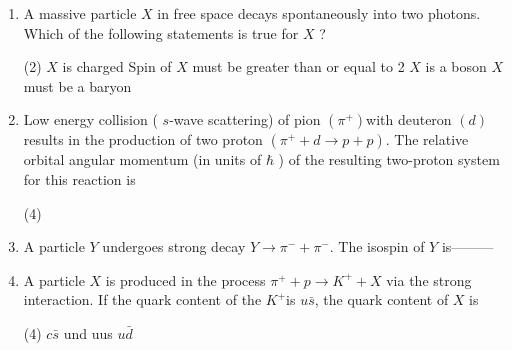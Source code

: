 \begin{enumerate}
\begin{tasks}
		\task[\textbf{a.}]Both (i) and (ii)
		\task[\textbf{b.}]Only (i)
		\task[\textbf{c.}]Only (ii)
		\task[\textbf{d.}]Neither (i) nor (ii)
	\end{tasks}
	\item  A massive particle $X$ in free space decays spontaneously into two photons. Which of the following statements is true for $X$ ?
{}
	 \begin{tasks}(2)
		\task[\textbf{a.}] $X$ is charged
		\task[\textbf{b.}]Spin of $X$ must be greater than or equal to 2
		\task[\textbf{c.}]$X$ is a boson
		\task[\textbf{d.}]$X$ must be a baryon 
	\end{tasks}
	\item  Low energy collision ( $s$-wave scattering) of pion $\left(\pi^{+}\right)$with deuteron $(d)$ results in the production of two proton $\left(\pi^{+}+d \rightarrow p+p\right)$. The relative orbital angular momentum (in units of $\hbar$ ) of the resulting two-proton system for this reaction is
	{}
	 \begin{tasks}(4)
	\end{tasks}
	\item  A particle $Y$ undergoes strong decay $Y \rightarrow \pi^{-}+\pi^{-}$. The isospin of $Y$ is---------
	{}
	\item  A particle $X$ is produced in the process $\pi^{+}+p \rightarrow K^{+}+X$ via the strong interaction. If the quark content of the $K^{+}$is $u \bar{s}$, the quark content of $X$ is
{}
	 \begin{tasks}(4)
		\task[\textbf{a.}]$c \bar{s}$
		\task[\textbf{b.}]und
		\task[\textbf{c.}]uus
		\task[\textbf{d.}]$u \bar{d}$ 
	\end{tasks}
\end{enumerate}